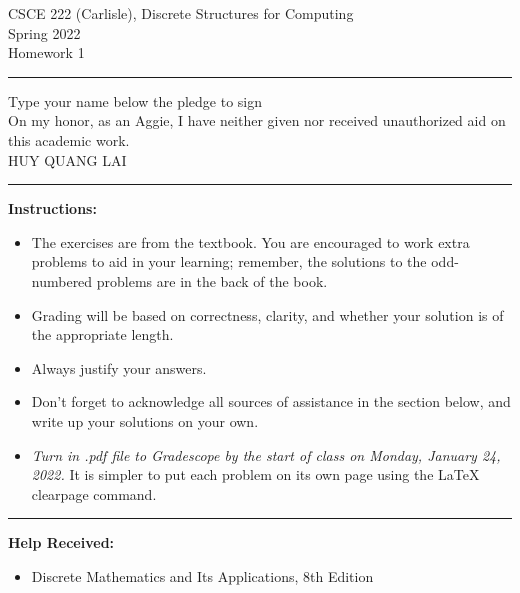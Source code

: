 \documentclass[12pt]{article}  %
\begin{document}
\begin{center}         %
{\large                %
CSCE 222 (Carlisle), Discrete Structures for Computing \\  %
Spring 2022 \\
Homework 1}
\end{center}
\rule{6in}{.1pt}       %
\begin{center}
{\large
Type your name below the pledge to sign\\
On my honor, as an Aggie, I have neither given nor received unauthorized aid on this academic work.\\
HUY QUANG LAI}
\end{center}


\rule{6in}{.1pt}       %
                    
\noindent              %
{\bf Instructions:}    %

\begin{itemize}        %
\item The exercises are from the textbook.  You are encouraged to work
      extra problems to aid in your learning; remember, the solutions to 
      the odd-numbered problems are in the back of the book.
\item Grading will be based on correctness, clarity, and whether your
      solution is of the appropriate length.
\item Always justify your answers.
\item Don't forget to acknowledge all sources of assistance in the section below, and write up your solutions on your own.
\item {\em Turn in .pdf file to Gradescope by the start of class on Monday, January 24, 2022.} It is simpler to put each problem on its own page using the LaTeX clearpage command.
\end{itemize}

\rule{6in}{.1pt}       %

{\bf Help Received:}    %
\begin{itemize}
\item Discrete Mathematics and Its Applications, 8th Edition
\end{itemize}
\end{document}
